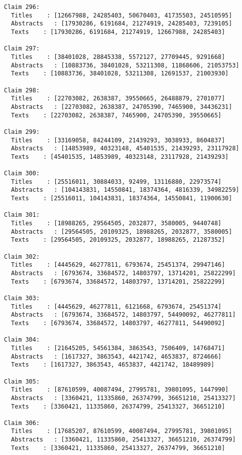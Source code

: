 \documentclass[11pt]{article}
\begin{document}
\begin{Verbatim}[commandchars=\\\{\}]
Claim 296:
  Titles    : [12667988, 24285403, 50670403, 41735503, 24510595]
  Abstracts   : [17930286, 6191684, 21274919, 24285403, 7239105]
  Texts    : [17930286, 6191684, 21274919, 12667988, 24285403]

Claim 297:
  Titles    : [38401028, 28845338, 5572127, 27709445, 9291668]
  Abstracts   : [10883736, 38401028, 53211308, 11868606, 21053753]
  Texts    : [10883736, 38401028, 53211308, 12691537, 21003930]

Claim 298:
  Titles    : [22703082, 2638387, 39550665, 26488879, 2701077]
  Abstracts   : [22703082, 2638387, 24705390, 7465900, 34436231]
  Texts    : [22703082, 2638387, 7465900, 24705390, 39550665]

Claim 299:
  Titles    : [33169058, 84244109, 21439293, 3038933, 8604837]
  Abstracts   : [14853989, 40323148, 45401535, 21439293, 23117928]
  Texts    : [45401535, 14853989, 40323148, 23117928, 21439293]

Claim 300:
  Titles    : [25516011, 30884033, 92499, 13116880, 22973574]
  Abstracts   : [104143831, 14550841, 18374364, 4816339, 34982259]
  Texts    : [25516011, 104143831, 18374364, 14550841, 11900630]

Claim 301:
  Titles    : [18988265, 29564505, 2032877, 3580005, 9440748]
  Abstracts   : [29564505, 20109325, 18988265, 2032877, 3580005]
  Texts    : [29564505, 20109325, 2032877, 18988265, 21287352]

Claim 302:
  Titles    : [4445629, 46277811, 6793674, 25451374, 29947146]
  Abstracts   : [6793674, 33684572, 14803797, 13714201, 25822299]
  Texts    : [6793674, 33684572, 14803797, 13714201, 25822299]

Claim 303:
  Titles    : [4445629, 46277811, 6121668, 6793674, 25451374]
  Abstracts   : [6793674, 33684572, 14803797, 54490092, 46277811]
  Texts    : [6793674, 33684572, 14803797, 46277811, 54490092]

Claim 304:
  Titles    : [21645205, 54561384, 3863543, 7506409, 14768471]
  Abstracts   : [1617327, 3863543, 4421742, 4653837, 8724666]
  Texts    : [1617327, 3863543, 4653837, 4421742, 18489989]

Claim 305:
  Titles    : [87610599, 40087494, 27995781, 39801095, 1447990]
  Abstracts   : [3360421, 11335860, 26374799, 36651210, 25413327]
  Texts    : [3360421, 11335860, 26374799, 25413327, 36651210]

Claim 306:
  Titles    : [17685207, 87610599, 40087494, 27995781, 39801095]
  Abstracts   : [3360421, 11335860, 25413327, 36651210, 26374799]
  Texts    : [3360421, 11335860, 25413327, 26374799, 36651210]


\end{Verbatim}
\end{document}
